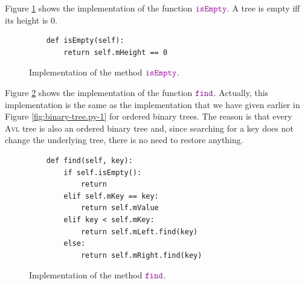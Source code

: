 Figure \ref{fig:avl-tree.ipython:isEmpty} shows the implementation of the function $\mytt{isEmpty}$.
A tree is empty iff its height is $0$.

\begin{figure}[!ht]
\centering
\begin{verbatim}
    def isEmpty(self):
        return self.mHeight == 0
\end{verbatim}
\vspace*{-0.3cm}
\caption{Implementation of the method $\mytt{isEmpty}$.}
\label{fig:avl-tree.ipython:isEmpty}
\end{figure}
\pagebreak

Figure \ref{fig:avl-tree.ipython:find} shows the implementation of the function $\mytt{find}$.
Actually, this implementation is the same as the implementation that we have given earlier in Figure
\ref{fig:binary-tree.py-1} for ordered binary trees.  The reason is that every \textsc{Avl} tree is also an
ordered binary tree and, since searching for a key does not change the underlying tree, there is no need to
restore anything. 

\begin{figure}[!ht]
\centering
\begin{verbatim}
    def find(self, key):
        if self.isEmpty():
            return
        elif self.mKey == key:
            return self.mValue
        elif key < self.mKey:
            return self.mLeft.find(key)
        else:
            return self.mRight.find(key)
\end{verbatim}
\vspace*{-0.3cm}
\caption{Implementation of the method $\mytt{find}$.}
\label{fig:avl-tree.ipython:find}
\end{figure}

